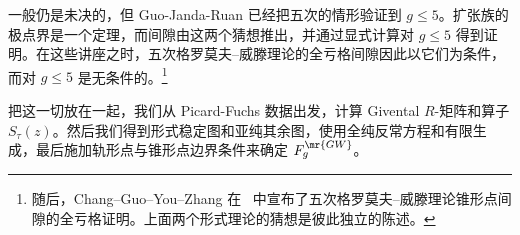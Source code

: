 \begin{rmk}
     一般仍是未决的，但 Guo-Janda-Ruan 已经把五次的情形验证到 \(g \leq 5\)。扩张族的极点界是一个定理，而间隙由这两个猜想推出，并通过显式计算对 \(g \leq 5\) 得到证明。在这些讲座之时，五次格罗莫夫–威滕理论的全亏格间隙因此以它们为条件，而对 \(g \leq 5\) 是无条件的。\footnote{随后，Chang--Guo--You--Zhang 在~\cite{CGYZ2026} 中宣布了五次格罗莫夫–威滕理论锥形点间隙的全亏格证明。上面两个形式理论的猜想是彼此独立的陈述。}
\end{rmk}

把这一切放在一起，我们从 Picard-Fuchs 数据出发，计算 Givental \(R\)-矩阵和算子 \(S_{\tau}(z)\)。然后我们得到形式稳定图和亚纯其余图，使用全纯反常方程和有限生成，最后施加轨形点与锥形点边界条件来确定 \(F_g^{\mr{GW}}\)。
